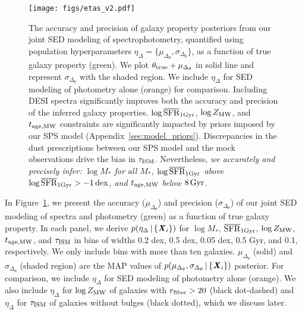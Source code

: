 \begin{figure}
\begin{center}
    \texttt{[image: figs/etas\_v2.pdf]}
    \caption{
        The accuracy and precision of galaxy property posteriors from our
        joint SED modeling of spectrophotometry, quantified using population
        hyperparameters $\eta_\Delta = \{\mu_{\Delta_{\theta}},
        \sigma_{\Delta_{\theta}}\}$, as a function of true galaxy property
        (green). 
        We plot $\theta_{\rm true} + \mu_{\Delta_{\theta}}$ in solid line and
        represent $\sigma_{\Delta_{\theta}}$ with the shaded region.
        We include $\eta_\Delta$ for SED modeling of photometry alone (orange)
        for comparison. 
        Including DESI spectra significantly improves both the accuracy and
        precision of the inferred galaxy properties. 
        $\log\overline{\rm SFR}_{\rm 1Gyr}$, $\log Z_{\rm MW}$, and $t_{\rm age, MW}$ constraints are
        significantly impacted by  priors imposed by our SPS model
        (Appendix~\ref{sec:model_priors}).
        Discrepancies in the dust prescriptions between our SPS model and the
        mock observations drive the bias in $\tau_{\rm ISM}$.
        Nevertheless, \emph{
            we accurately and precisely infer: 
            $\log M_*$ for all $M_*$, $\log\overline{\rm SFR}_{\rm 1Gyr}$ above $\log\overline{\rm SFR}_{\rm 1Gyr} > -1\,{\rm
            dex}$, and $t_{\rm age, MW}$ below $8\,{\rm Gyr}$.
        }
        } \label{fig:etas}
\end{center}
\end{figure}

In Figure~\ref{fig:etas}, we present the accuracy ($\mu_{\Delta_{\theta}}$) and
precision ($\sigma_{\Delta_{\theta}}$) of our joint SED modeling of spectra and
photometry (green) as a function of true galaxy property. 
In each panel, we derive $p(\eta_\Delta \,|\, \{{\textbf{\textit{X}}_i}\})$ for 
$\log M_*$, $\overline{\rm SFR}_{\rm 1Gyr}$, $\log Z_{\rm MW}$, $t_{\rm age, MW}$, and $\tau_{\rm ISM}$ in bins of
widths 0.2 dex, 0.5 dex, 0.05 dex, 0.5 Gyr, and 0.1, respectively. 
We only include bins with more than ten galaxies. 
$\mu_{\Delta_{\theta}}$ (solid) and $\sigma_{\Delta_{\theta}}$ (shaded region)
are the MAP values of $p(\mu_{\Delta_{\theta}}, \sigma_{\Delta_{\theta}}
\,|\, \{{\textbf{\textit{X}}_i}\})$ posterior. 
For comparison, we include $\eta_\Delta$ for SED modeling of photometry alone
(orange).
We also include $\eta_\Delta$ for $\log Z_{\rm MW}$ of galaxies with $r_{\rm fiber} >
20$ (black dot-dashed) and $\eta_\Delta$ for $\tau_{\rm ISM}$ of galaxies
without bulges (black dotted), which we discuss later. 

